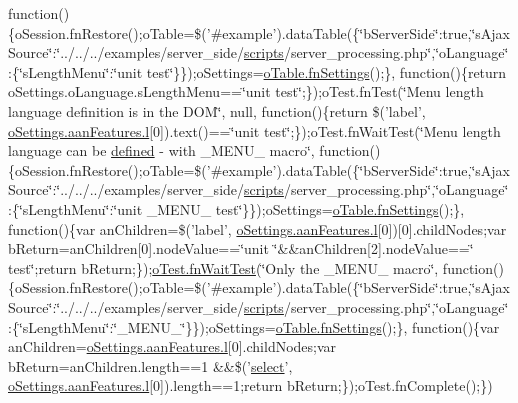 \begin{DoxyCompactItemize}
function()\{o\+Session.\+fn\+Restore();o\+Table=\$('\#example').data\+Table(\{\char`\"{}b\+Server\+Side\char`\"{}\+:true,\char`\"{}s\+Ajax\+Source\char`\"{}\+:\char`\"{}../../../examples/server\+\_\+side/\hyperlink{tinymce_8jquery_8dev_8js_a09066d4d580eeec222f858d588b4cdef}{scripts}/server\+\_\+processing.\+php\char`\"{},\char`\"{}o\+Language\char`\"{}\+:\{\char`\"{}s\+Length\+Menu\char`\"{}\+:\char`\"{}unit test\char`\"{}\}\});o\+Settings=\hyperlink{api_8methods_8js_a78f387fab92a85c2cb7830bc5d8a6141}{o\+Table.\+fn\+Settings}();\}, function()\{return o\+Settings.\+o\+Language.\+s\+Length\+Menu==\char`\"{}unit test\char`\"{};\});o\+Test.\+fn\+Test(\char`\"{}Menu length language definition is in the D\+O\+M\char`\"{}, null, function()\{return \$('label', \hyperlink{jquery_8data_tables_8min_8js_aae3c400cfa9afd0584b6226ac3804a40}{o\+Settings.\+aan\+Features.\+l}\mbox{[}0\mbox{]}).text()==\char`\"{}unit test\char`\"{};\});o\+Test.\+fn\+Wait\+Test(\char`\"{}Menu length language can be \hyperlink{tinymce_8js_a8cb6212cde9926d156ab5912c9b547cf}{defined} -\/ with \+\_\+\+M\+E\+N\+U\+\_\+ macro\char`\"{}, function()\{o\+Session.\+fn\+Restore();o\+Table=\$('\#example').data\+Table(\{\char`\"{}b\+Server\+Side\char`\"{}\+:true,\char`\"{}s\+Ajax\+Source\char`\"{}\+:\char`\"{}../../../examples/server\+\_\+side/\hyperlink{tinymce_8jquery_8dev_8js_a09066d4d580eeec222f858d588b4cdef}{scripts}/server\+\_\+processing.\+php\char`\"{},\char`\"{}o\+Language\char`\"{}\+:\{\char`\"{}s\+Length\+Menu\char`\"{}\+:\char`\"{}unit \+\_\+\+M\+E\+N\+U\+\_\+ test\char`\"{}\}\});o\+Settings=\hyperlink{api_8methods_8js_a78f387fab92a85c2cb7830bc5d8a6141}{o\+Table.\+fn\+Settings}();\}, function()\{var an\+Children=\$('label', \hyperlink{jquery_8data_tables_8min_8js_aae3c400cfa9afd0584b6226ac3804a40}{o\+Settings.\+aan\+Features.\+l}\mbox{[}0\mbox{]})\mbox{[}0\mbox{]}.child\+Nodes;var b\+Return=an\+Children\mbox{[}0\mbox{]}.node\+Value==\char`\"{}unit \char`\"{}\&\&an\+Children\mbox{[}2\mbox{]}.node\+Value==\char`\"{} test\char`\"{};return b\+Return;\});\hyperlink{onhold_24__server-side_2__zero__config_8js_ab25c4d596771c0133cdc45178ce72c3d}{o\+Test.\+fn\+Wait\+Test}(\char`\"{}Only the \+\_\+\+M\+E\+N\+U\+\_\+ macro\char`\"{}, function()\{o\+Session.\+fn\+Restore();o\+Table=\$('\#example').data\+Table(\{\char`\"{}b\+Server\+Side\char`\"{}\+:true,\char`\"{}s\+Ajax\+Source\char`\"{}\+:\char`\"{}../../../examples/server\+\_\+side/\hyperlink{tinymce_8jquery_8dev_8js_a09066d4d580eeec222f858d588b4cdef}{scripts}/server\+\_\+processing.\+php\char`\"{},\char`\"{}o\+Language\char`\"{}\+:\{\char`\"{}s\+Length\+Menu\char`\"{}\+:\char`\"{}\+\_\+\+M\+E\+N\+U\+\_\+\char`\"{}\}\});o\+Settings=\hyperlink{api_8methods_8js_a78f387fab92a85c2cb7830bc5d8a6141}{o\+Table.\+fn\+Settings}();\}, function()\{var an\+Children=\hyperlink{jquery_8data_tables_8min_8js_aae3c400cfa9afd0584b6226ac3804a40}{o\+Settings.\+aan\+Features.\+l}\mbox{[}0\mbox{]}.child\+Nodes;var b\+Return=an\+Children.\+length==1 \&\&\$('\hyperlink{validate_8js_a107b4864f70df98ef4a521c0b2bc80c7}{select}', \hyperlink{jquery_8data_tables_8min_8js_aae3c400cfa9afd0584b6226ac3804a40}{o\+Settings.\+aan\+Features.\+l}\mbox{[}0\mbox{]}).length==1;return b\+Return;\});o\+Test.\+fn\+Complete();\})
\end{DoxyCompactItemize}


